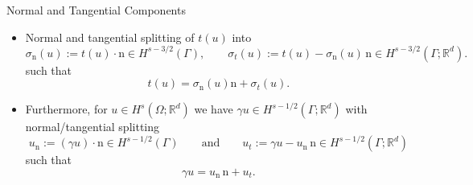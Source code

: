 \documentclass[10pt,aspectratio=169]{beamer}
\def\R{{\mathbb R}}
\begin{document}
\begin{frame}{Normal and Tangential Components}
	\begin{itemize}
		\item Normal and tangential splitting of $t(u)$ into
		      \begin{equation*}
			      \sigma_\mathrm{n}(u):=t(u)\cdot \mathrm{n}\in H^{s-3/2}(\Gamma),
			      \qquad
			      \sigma_t(u):=t(u)-\sigma_\mathrm{n}(u)\,\mathrm{n}\in H^{s-3/2}(\Gamma;\R^d).
		      \end{equation*}
		      such that
		      \begin{equation*}
			      t(u) = \sigma_\mathrm{n}(u)\mathrm{n} + \sigma_t(u).
		      \end{equation*}
		\item Furthermore, for $u\in H^{s}(\Omega;\R^d)$ we have $\gamma u\in H^{s-1/2}(\Gamma;\R^d)$ with normal/tangential splitting
		      \begin{equation*}
			      u_\mathrm{n}:= (\gamma u)\cdot \mathrm{n}\in H^{s-1/2}(\Gamma)\qquad\text{and}\qquad u_t:= \gamma u- u_\mathrm{n}\,\mathrm{n}\in H^{s-1/2}(\Gamma;\R^d)
		      \end{equation*}
		      such that
		      \begin{equation*}
			      \gamma u = u_\mathrm{n}\,\mathrm{n}+u_t.
		      \end{equation*}
	\end{itemize}
\end{frame}
\end{document}
